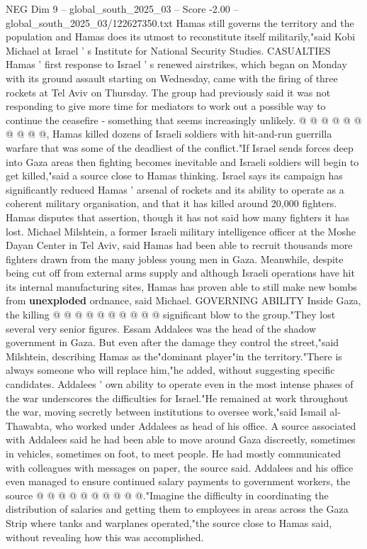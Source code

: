 \begin{textsample}{NEG Dim 9 – global\_south\_2025\_03 – Score -2.00 – global\_south\_2025\_03/122627350.txt}
Hamas still governs the territory and the population and Hamas does its utmost to reconstitute itself militarily,"said Kobi Michael at Israel ' s Institute for National Security Studies.
CASUALTIES Hamas ' first response to Israel ' s renewed airstrikes, which began on Monday with its ground assault starting on Wednesday, came with the firing of three rockets at Tel Aviv on Thursday.
The group had previously said it was not responding to give more time for mediators to work out a possible way to continue the ceasefire - something that seems increasingly unlikely. @ @ @ @ @ @ @ @ @ @, Hamas killed dozens of Israeli soldiers with hit-and-run guerrilla warfare that was some of the deadliest of the conflict."If Israel sends forces deep into Gaza areas then fighting becomes inevitable and Israeli soldiers will begin to get killed,"said a source close to Hamas thinking.
Israel says its campaign has significantly reduced Hamas ' arsenal of rockets and its ability to operate as a coherent military organisation, and that it has killed around 20,000 fighters.
Hamas disputes that assertion, though it has not said how many fighters it has lost.
Michael Milshtein, a former Israeli military intelligence officer at the Moshe Dayan Center in Tel Aviv, said Hamas had been able to recruit thousands more fighters drawn from the many jobless young men in Gaza.
Meanwhile, despite being cut off from external arms supply and although Israeli operations have hit its internal manufacturing sites, Hamas has proven able to still make new bombs from \textbf{unexploded} ordnance, said Michael.
GOVERNING ABILITY Inside Gaza, the killing @ @ @ @ @ @ @ @ @ @ significant blow to the group."They lost several very senior figures.
Essam Addalees was the head of the shadow government in Gaza.
But even after the damage they control the street,"said Milshtein, describing Hamas as the"dominant player"in the territory."There is always someone who will replace him,"he added, without suggesting specific candidates.
Addalees ' own ability to operate even in the most intense phases of the war underscores the difficulties for Israel."He remained at work throughout the war, moving secretly between institutions to oversee work,"said Ismail al-Thawabta, who worked under Addalees as head of his office.
A source associated with Addalees said he had been able to move around Gaza discreetly, sometimes in vehicles, sometimes on foot, to meet people.
He had mostly communicated with colleagues with messages on paper, the source said.
Addalees and his office even managed to ensure continued salary payments to government workers, the source @ @ @ @ @ @ @ @ @ @."Imagine the difficulty in coordinating the distribution of salaries and getting them to employees in areas across the Gaza Strip where tanks and warplanes operated,"the source close to Hamas said, without revealing how this was accomplished.

\end{textsample}
